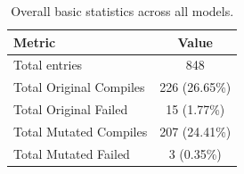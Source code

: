 \begin{table}[h]
\centering
\begin{tabular}{|l|c|}
\hline
\textbf{Metric} & \textbf{Value} \\
\hline
Total entries & 848 \\
Total Original Compiles & 226 (26.65\%) \\
Total Original Failed & 15 (1.77\%) \\
Total Mutated Compiles & 207 (24.41\%) \\
Total Mutated Failed & 3 (0.35\%) \\
\hline
\end{tabular}
\caption{Overall basic statistics across all models.}
\label{tab:overall-stats}
\end{table}